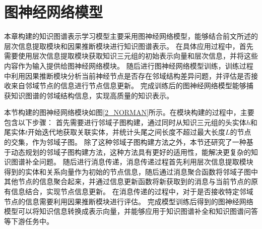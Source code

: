 \documentclass[algorithmlist, AutoFakeBold, AutoFakeSlant, figurelist, tablelist, nomlist, engineering]{seuthesix}
\begin{document}


\section{图神经网络模型}
本章构建的知识图谱表示学习模型主要采用图神经网络模型，能够结合前文所述的层次信息提取模块和因果推断模块进行知识图谱表示。
在具体应用过程中，首先需要使用层次信息提取模块获取知识三元组的初始表示向量和层次信息，并将这些内容作为输入提供给图神经网络模块。
随后进行图神经网络模型训练，训练过程中利用因果推断模块分析当前神经节点是否存在邻域结构差异问题，并评估是否接收来自邻域节点的信息进行节点信息更新。
完成训练后的图神经网络模型能够捕获知识图谱的邻域结构信息，实现高质量的知识表示。

本节构建的图神经网络模块如图\ref{2_NORMAN}所示。在模块构建的过程中，主要包含以下步骤：
首先需要进行邻域子图构建，通过同时从知识三元组的头实体$h$和尾实体$t$开始迭代地获取关联实体，并统计头尾之间长度不超过最大长度$L$的节点的交集，作为邻域子图。
除了这种邻域子图构建方法之外，本节还研究了一种基于动态规划的邻域子图构建方法，这种方法具有更好的适用性，能解决更复杂的知识图谱补全问题。
随后进行消息传递，消息传递过程首先利用层次信息提取模块得到的实体和关系向量作为初始的节点信息，随后通过消息聚合函数将邻域子图中其他节点的信息聚合起来，并通过信息更新函数将新获取到的消息与当前节点的原有信息结合，实现节点信息更新。
在消息传递的过程中，对于是否接收特定邻域节点的信息需要利用因果推断模块进行评估。
完成模型训练后得到的图神经网络模型可以将知识信息转换成表示向量，并能够应用于知识图谱补全和知识图谱问答等下游任务中。
\end{document}
